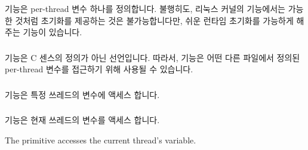  기능은 per-thread 변수 하나를 정의합니다.
불행히도, 리눅스 커널의  기능에서는 가능한 것처럼
초기화를 제공하는 것은 불가능합니다만, 쉬운 런타임 초기화를 가능하게 해주는
 기능이 있습니다.

\subsubsection{}

 기능은 C 센스의 정의가 아닌 선언입니다.
따라서,  기능은 어떤 다른 파일에서 정의된
per-thread 변수를 접근하기 위해 사용될 수 있습니다.

\subsubsection{}

 기능은 특정 쓰레드의 변수에 액세스 합니다.

\subsubsection{}

 기능은 현재 쓰레드의 변수를 액세스 합니다.

\iffalse

The  primitive accesses the current thread's variable.


